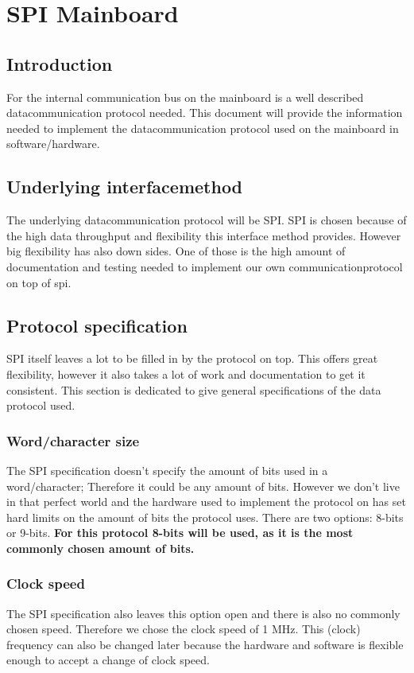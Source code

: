 \chapter{SPI Mainboard}
\label{appendix::SPI_SLAVE_PROTOCOL}
\section{Introduction}
For the internal communication bus on the mainboard is a well described datacommunication protocol needed. This document will provide the information needed to implement the datacommunication protocol used on the mainboard in software/hardware.
\section{Underlying interfacemethod}
The underlying datacommunication protocol will be SPI. SPI is chosen because of the high data throughput and flexibility this interface method provides. However big flexibility has also down sides. One of those is the high amount of documentation and testing needed to implement our own communicationprotocol on top of spi. 
\section{Protocol specification}
SPI itself leaves a lot to be filled in by the protocol on top. This offers great flexibility, however it also takes a lot of work and documentation to get it consistent. This section is dedicated to give general specifications of the data protocol used.
\subsection{Word/character size}
The SPI specification doesn't specify the amount of bits used in a word/character; Therefore it could be any amount of bits. However we don't live in that perfect world and the hardware used to implement the protocol on has set hard limits on the amount of bits the protocol uses.
There are two options: 8-bits or 9-bits. \textbf{For this protocol 8-bits will be used, as it is the most commonly chosen amount of bits. }
\subsection{Clock speed}
The SPI specification also leaves this option open and there is also no commonly chosen speed. Therefore we chose the clock speed of 1 MHz. This (clock) frequency can also be changed later because the hardware and software is flexible enough to accept a change of clock speed.
